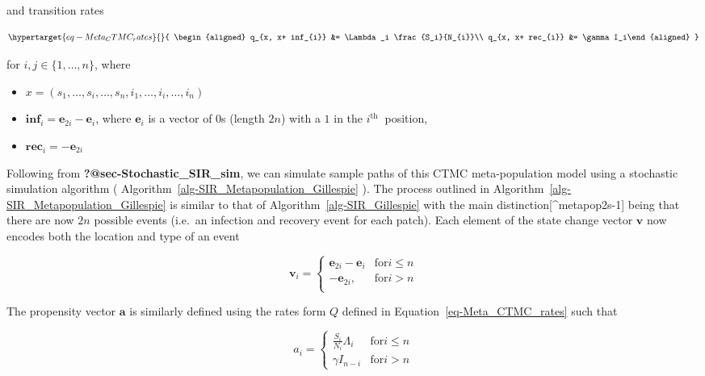 \documentclass[
  letterpaper,
  DIV=11,
  numbers=noendperiod]{scrartcl}
\begin{document}
and transition rates

\begin{equation}\protect\hypertarget{eq-Meta_CTMC_rates}{}{
\begin{aligned}
q_{x, x+ inf_{i}} &=  \Lambda_i \frac{S_i}{N_{i}}\\
q_{x, x+ rec_{i}} &= \gamma I_i\end{aligned}
}\label{eq-Meta_CTMC_rates}\end{equation}

for \(i, j \in \{1,\ldots,n\}\), where

\begin{itemize}
\item
  \(x = \left(s_1, \ldots, s_i, \ldots, s_n, i_1,\ldots, i_i, \ldots , i_n\right)\)
\item
  \(\mathbf{inf}_{i}=\mathbf{e}_{2 i}-\mathbf{e}_{i}\), where
  \(\mathbf{e}_i\) is a vector of \(0\)s (length \(2n\)) with a \(1\) in
  the \(i^{\text {th }}\) position,
\item
  \(\mathbf{rec}_{i} = -\mathbf{e}_{2i}\)
\end{itemize}

Following from \textbf{?@sec-Stochastic\_SIR\_sim}, we can simulate
sample paths of this CTMC meta-population model using a stochastic
simulation algorithm
( Algorithm~\ref{alg-SIR_Metapopulation_Gillespie} ). The process
outlined in  Algorithm~\ref{alg-SIR_Metapopulation_Gillespie}  is
similar to that of  Algorithm~\ref{alg-SIR_Gillespie}  with the main
distinction{[}\^{}metapop2s-1{]} being that there are now \(2n\)
possible events (i.e.~an infection and recovery event for each patch).
Each element of the state change vector \(\mathbf{v}\) now encodes both
the location and type of an event

\[
\mathbf{v}_{i} = \begin{cases}
\mathbf{e}_{2i} - \mathbf{e}_{i} & \text{for} i \leq n \\
-\mathbf{e}_{2i}, & \text{for} i > n \\
\end{cases} 
\]

The propensity vector \(\mathbf{a}\) is similarly defined using the
rates form \(Q\) defined in Equation~\ref{eq-Meta_CTMC_rates} such that

\[
a_{i}  =  \begin{cases} \frac{S_i}{N_{i}} \Lambda_i & \text{for} i \leq n \\
\gamma I_{n-i} & \text{for} i > n
\end{cases} 
\]
\end{document}
